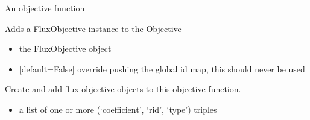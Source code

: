 \documentclass[letterpaper,10pt,english]{sphinxmanual}
\begin{document}
\begin{fulllineitems}
\label{\detokenize{modules_doc:cbmpy.CBModel.Objective}}
\pysigstartsignatures
{}
\pysigstopsignatures
\sphinxAtStartPar
An objective function

\begin{fulllineitems}
\label{\detokenize{modules_doc:cbmpy.CBModel.Objective.addFluxObjective}}
\pysigstartsignatures
{}
\pysigstopsignatures
\sphinxAtStartPar
Adds a FluxObjective instance to the Objective
\begin{itemize}
\item {} 
\sphinxAtStartPar
{} the FluxObjective object

\item {} 
\sphinxAtStartPar
{} {[}default=False{]} override pushing the global id map, this should never be used

\end{itemize}

\end{fulllineitems}


\begin{fulllineitems}
\label{\detokenize{modules_doc:cbmpy.CBModel.Objective.createFluxObjectives}}
\pysigstartsignatures
{}
\pysigstopsignatures
\sphinxAtStartPar
Create and add flux objective objects to this objective function.
\begin{itemize}
\item {} 
\sphinxAtStartPar
{} a list of one or more (‘coefficient’, ‘rid’, ‘type’) triples

\end{itemize}

\end{fulllineitems}


\end{fulllineitems}
\end{document}
